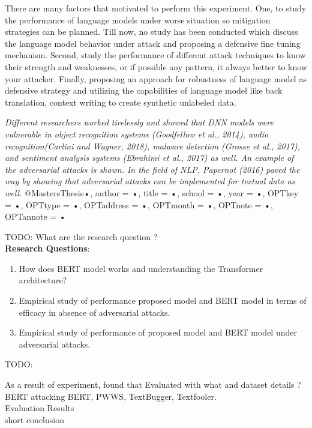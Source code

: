 \documentclass[%
	BCOR=8mm, %
	DIV=12, 
	toc=bibliography, %
	toc=listof, %
	oneside, %
	egregdoesnotlikesansseriftitles, %
	]{scrbook}
\begin{document}
There are many factors that motivated to perform this experiment. One, to study the performance of language models under worse situation so mitigation strategies can be planned. Till now, no  
study has been conducted which discuss the language model behavior under attack and proposing a defensive fine tuning mechanism.  Second, study the performance of different attack techniques 
to know their strength and weaknesses, or if possible any pattern, it always better to know your attacker. Finally, proposing an approach for robustness of language model as defensive strategy and utilizing the capabilities of language model like back translation, context writing to create synthetic unlabeled data.

\textit{ Different researchers worked tirelessly and showed that DNN models were vulnerable in object recognition systems (Goodfellow et al., 2014), audio recognition(Carlini and Wagner, 2018),
 malware detection (Grosse et al., 2017), and sentiment analysis systems (Ebrahimi et al., 2017) as well. An example of the adversarial attacks is shown.\cite{huq_adversarial_2020}
In the field of NLP, Papernot (2016) paved the way by showing that adversarial attacks can be implemented for textual data as well. \cite{huq_adversarial_2020}}
@MastersThesis{•,
author = {•},
title = {•},
school = {•},
year = {•},
OPTkey = {•},
OPTtype = {•},
OPTaddress = {•},
OPTmonth = {•},
OPTnote = {•},
OPTannote = {•}
}

TODO:
What are the research question ? \\
\textbf{Research Questions}:
\begin{enumerate}
    \item How does BERT model works and understanding the Transformer architecture?
    \item Empirical study of performance proposed model and BERT model in terms of efficacy in absence of adversarial attacks.
    \item Empirical study of performance of proposed model and BERT model under adversarial attacks.
\end{enumerate}

 TODO: 
 
 As a result of experiment, found that 
 Evaluated with what and dataset details ?\\
 BERT attacking BERT, PWWS, TextBugger, Textfooler.\\
 Evaluation Results\\
 short conclusion\\
 
\end{document}
